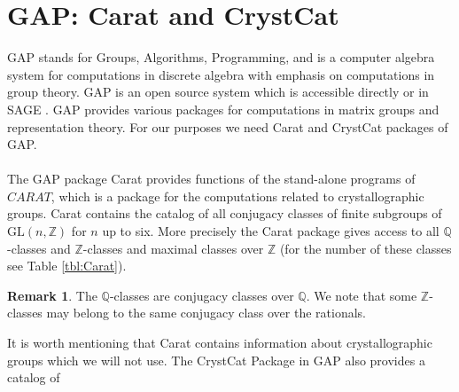 \documentclass[a4paper, 14pt]{extarticle}
\theoremstyle{plain}
\theoremstyle{definition}
\newtheorem*{remark}{Remark}
\newcommand{\Z}{\ensuremath{\mathbb{Z}}}
\newcommand{\Q}{\ensuremath{\mathbb{Q}}}
\begin{document}
\section{GAP: Carat and CrystCat}
GAP \cite{GAP4} stands for Groups, Algorithms, Programming, and is a computer 
algebra system for computations in discrete algebra with emphasis on computations 
in group theory. GAP is an open source system which is accessible directly or 
in SAGE \cite{sagemath}. GAP provides various packages for computations in matrix 
groups and representation theory. For our purposes we need Carat and CrystCat packages of GAP.\\
\\
The GAP package Carat provides functions of the stand-alone programs of $CARAT$, 
which is a package for the computations related to crystallographic groups. Carat 
contains the catalog of all conjugacy classes of finite subgroups of $\mathrm{GL}(n,\Z)$ 
for $n$ up to six. More precisely the Carat package gives access to all 
$\Q$-classes and $\Z$-classes and maximal classes over $\Z$ (for the number of 
these classes see Table \ref{tbl:Carat}).  
\begin{remark}
The $\Q$-classes are conjugacy classes over $\Q$. We note that some $\Z$-classes 
may belong to the same conjugacy class over the rationals.
\end{remark}
It is worth mentioning that Carat contains information about crystallographic groups 
which we will not use. The CrystCat Package in GAP also provides a catalog of 
\end{document}

